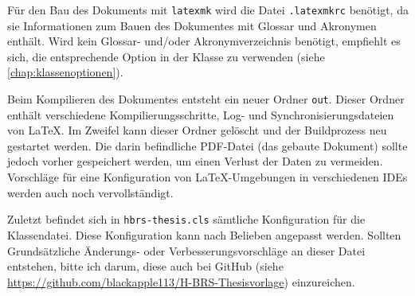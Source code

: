 Für den Bau des Dokuments mit \texttt{latexmk} wird die Datei \texttt{.latexmkrc} benötigt, da sie Informationen zum Bauen des Dokumentes mit Glossar und Akronymen enthält. Wird kein Glossar- und/oder Akronymverzeichnis benötigt, empfiehlt es sich, die entsprechende Option in der Klasse zu verwenden (siehe \autoref{chap:klassenoptionen}).

Beim Kompilieren des Dokumentes entsteht ein neuer Ordner \texttt{out}. Dieser Ordner enthält verschiedene Kompilierungsschritte, Log- und Synchronisierungsdateien von \LaTeX. Im Zweifel kann dieser Ordner gelöscht und der Buildprozess neu gestartet werden. Die darin befindliche PDF-Datei (das gebaute Dokument) sollte jedoch vorher gespeichert werden, um einen Verlust der Daten zu vermeiden. Vorschläge für eine Konfiguration von \LaTeX-Umgebungen in verschiedenen IDEs werden auch noch vervollständigt.

Zuletzt befindet sich in \texttt{hbrs-thesis.cls} sämtliche Konfiguration für die Klassendatei. Diese Konfiguration kann nach Belieben angepasst werden. Sollten Grundsätzliche Änderungs- oder Verbesserungsvorschläge an dieser Datei entstehen, bitte ich darum, diese auch bei GitHub (siehe \url{https://github.com/blackapple113/H-BRS-Thesisvorlage}) einzureichen.
